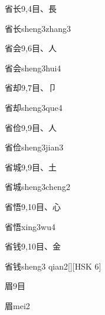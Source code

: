 \begin{entry}{省长}{9,4}{⽬、⾧}
  \begin{phonetics}{省长}{sheng3zhang3}
  \end{phonetics}
\end{entry}

\begin{entry}{省会}{9,6}{⽬、⼈}
  \begin{phonetics}{省会}{sheng3hui4}
  \end{phonetics}
\end{entry}

\begin{entry}{省却}{9,7}{⽬、⼙}
  \begin{phonetics}{省却}{sheng3que4}
  \end{phonetics}
\end{entry}

\begin{entry}{省俭}{9,9}{⽬、⼈}
  \begin{phonetics}{省俭}{sheng3jian3}
  \end{phonetics}
\end{entry}

\begin{entry}{省城}{9,9}{⽬、⼟}
  \begin{phonetics}{省城}{sheng3cheng2}
  \end{phonetics}
\end{entry}

\begin{entry}{省悟}{9,10}{⽬、⼼}
  \begin{phonetics}{省悟}{xing3wu4}
  \end{phonetics}
\end{entry}

\begin{entry}{省钱}{9,10}{⽬、⾦}
  \begin{phonetics}{省钱}{sheng3 qian2}[][HSK 6]
  \end{phonetics}
\end{entry}

\begin{entry}{眉}{9}{⽬}
  \begin{phonetics}{眉}{mei2}
  \end{phonetics}
\end{entry}

